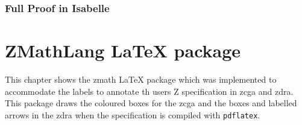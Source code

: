 \subsection{Full Proof in Isabelle}
\label{app:sb6}
\begin{multicols}{2}
\end{multicols}

\chapter{ZMathLang \LaTeX{} package}
\label{app:zmathlatex}

This chapter shows the \gls{zmath} \LaTeX{} package which was implemented to
accommodate the labels to annotate th users Z specification in \gls{zcga} 
and \gls{zdra}. This package draws the coloured boxes for the \gls{zcga} 
and the boxes and labelled arrows in the \gls{zdra} when the specification 
is compiled with \texttt{pdflatex}.

